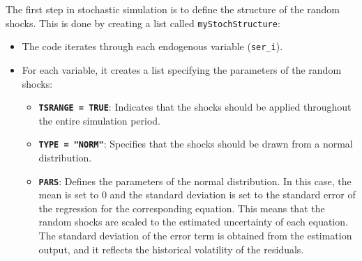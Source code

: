 \documentclass[
  letterpaper,
  DIV=11,
  numbers=noendperiod]{scrreport}
\newenvironment{Shaded}{\begin{snugshade}}{\end{snugshade}}
\newcommand{\AttributeTok}[1]{\textcolor[rgb]{0.40,0.45,0.13}{#1}}
\newcommand{\CommentTok}[1]{\textcolor[rgb]{0.37,0.37,0.37}{#1}}
\newcommand{\ConstantTok}[1]{\textcolor[rgb]{0.56,0.35,0.01}{#1}}
\newcommand{\ControlFlowTok}[1]{\textcolor[rgb]{0.00,0.23,0.31}{\textbf{#1}}}
\newcommand{\DecValTok}[1]{\textcolor[rgb]{0.68,0.00,0.00}{#1}}
\newcommand{\FunctionTok}[1]{\textcolor[rgb]{0.28,0.35,0.67}{#1}}
\newcommand{\NormalTok}[1]{\textcolor[rgb]{0.00,0.23,0.31}{#1}}
\newcommand{\OtherTok}[1]{\textcolor[rgb]{0.00,0.23,0.31}{#1}}
\newcommand{\SpecialCharTok}[1]{\textcolor[rgb]{0.37,0.37,0.37}{#1}}
\newcommand{\StringTok}[1]{\textcolor[rgb]{0.13,0.47,0.30}{#1}}
\providecommand{\tightlist}{%
  \setlength{\itemsep}{0pt}\setlength{\parskip}{0pt}}\usepackage{longtable,booktabs,array}
\begin{document}
The first step in stochastic simulation is to define the structure of
the random shocks. This is done by creating a list called
\texttt{myStochStructure}:

\begin{Shaded}
\end{Shaded}

\begin{itemize}
\tightlist
\item
  The code iterates through each endogenous variable (\texttt{ser\_i}).
\item
  For each variable, it creates a list specifying the parameters of the
  random shocks:

  \begin{itemize}
  \tightlist
  \item
    \textbf{\texttt{TSRANGE\ =\ TRUE}}: Indicates that the shocks should
    be applied throughout the entire simulation period.
  \item
    \textbf{\texttt{TYPE\ =\ "NORM"}}: Specifies that the shocks should
    be drawn from a normal distribution.
  \item
    \textbf{\texttt{PARS}}: Defines the parameters of the normal
    distribution. In this case, the mean is set to 0 and the standard
    deviation is set to the standard error of the regression for the
    corresponding equation. This means that the random shocks are scaled
    to the estimated uncertainty of each equation. The standard
    deviation of the error term is obtained from the estimation output,
    and it reflects the historical volatility of the residuals.
  \end{itemize}
\end{itemize}
\end{document}

